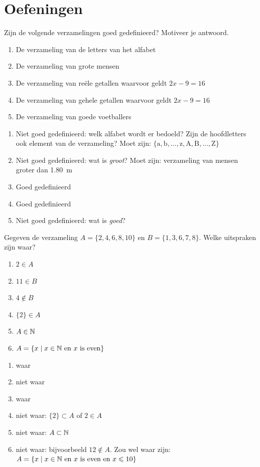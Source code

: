 \section{Oefeningen}
\begin{oef}
Zijn de volgende verzamelingen goed gedefinieerd? Motiveer je antwoord.
\begin{enumerate}
\item De verzameling van de letters van het alfabet
\item De verzameling van grote mensen
\item De verzameling van re\"ele getallen waarvoor geldt $2x-9=16$
\item De verzameling van gehele getallen waarvoor geldt $2x-9=16$
\item De verzameling van goede voetballers
\end{enumerate}
\begin{opl}
\begin{enumerate}
\item Niet goed gedefinieerd: welk alfabet wordt er bedoeld? Zijn de hoofdletters ook element van de verzameling? Moet zijn: $\{\text{a},\text{b},\dots,\text{z},\text{A},\text{B},\dots,\text{Z}\}$
\item Niet goed gedefinieerd: wat is \emph{groot}? Moet zijn: verzameling van mensen groter dan \SI{1.80}{\meter}
\item Goed gedefinieerd
\item Goed gedefinieerd
\item Niet goed gedefinieerd: wat is \emph{goed}?
\end{enumerate}
\end{opl}
\end{oef}



\begin{oef}
Gegeven de verzameling $A=\{2,4,6,8,10\}$ en $B=\{1,3,6,7,8\}$. Welke uitspraken zijn waar? 
\begin{enumerate}
\item $2\in A$
\item $11\in B$
\item $4 \not \in B$
\item $\{2\}\in A$
\item $A\in \mathbb{N}$
\item $A=\{x\mid x\in \mathbb{N} \mathrm{~en~}x\mathrm{~is~even}\}$
\end{enumerate}
\begin{opl}
\begin{enumerate}
\item waar
\item niet waar
\item waar
\item niet waar: $\{2\}\subset A$ of $2\in A$
\item niet waar: $A\subset \mathbb{N}$
\item niet waar: bijvoorbeeld $12\not \in A$. Zou wel waar zijn: $A=\{x\mid x\in \mathbb{N} \mathrm{~en~}x\text{~is~even en }x\leqslant 10\}$
\end{enumerate}
\end{opl}
\end{oef}




